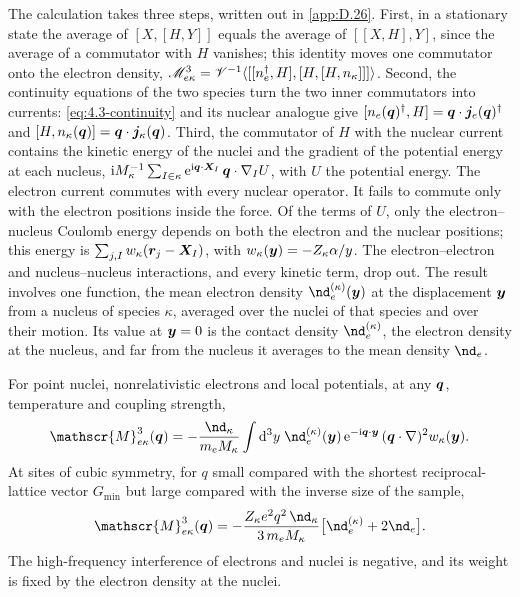 The calculation takes three steps, written out in \cref{app:D.26}. First, in a stationary state the average of $[X, [H, Y]]$ equals the average of $[[X, H], Y]$, since the average of a commutator with $H$ vanishes; this identity moves one commutator onto the electron density, $\mathscr{M}^3_{e\kappa} = \mathscr{V}^{-1}\langle[[n_e^\dagger, H], [H, [H, n_\kappa]]]\rangle$. Second, the continuity equations of the two species turn the two inner commutators into currents: \cref{eq:4.3-continuity} and its nuclear analogue give $[n_e(\bm{q})^\dagger, H] = \bm{q}\cdot\bm{j}_e(\bm{q})^\dagger$ and $[H, n_\kappa(\bm{q})] = \bm{q}\cdot\bm{j}_\kappa(\bm{q})$. Third, the commutator of $H$ with the nuclear current contains the kinetic energy of the nuclei and the gradient of the potential energy at each nucleus, $\mathrm{i} M_\kappa^{-1}\sum_{I\in\kappa}\mathrm{e}^{\mathrm{i}\bm{q}\cdot\bm{X}_I}\,\bm{q}\cdot\nabla_IU$, with $U$ the potential energy. The electron current commutes with every nuclear operator. It fails to commute only with the electron positions inside the force. Of the terms of $U$, only the electron--nucleus Coulomb energy depends on both the electron and the nuclear positions; this energy is $\sum_{j,I}w_\kappa(\bm{r}_j - \bm{X}_I)$, with $w_\kappa(\bm{y}) = -Z_\kappa\alpha/y$. The electron--electron and nucleus--nucleus interactions, and every kinetic term, drop out. The result involves one function, the mean electron density $\nd_e^{(\kappa)}(\vect{y})$ at the displacement $\bm{y}$ from a nucleus of species $\kappa$, averaged over the nuclei of that species and over their motion. Its value at $\bm{y} = 0$ is the contact density $\nd_e^{(\kappa)}$, the electron density at the nucleus, and far from the nucleus it averages to the mean density $\nd_e$.
\begin{keyresult}
For point nuclei, nonrelativistic electrons and local potentials, at any $\bm{q}$, temperature and coupling strength,
\begin{equation}
  \mathscr{M}^3_{e\kappa}(\vect{q}) = -\frac{\nd_\kappa}{m_eM_\kappa}\int\dd^3y\;\nd_e^{(\kappa)}(\vect{y})\,\ee^{-\ii\vect{q}\cdot\vect{y}}\,(\vect{q}\cdot\nabla)^2w_\kappa(\vect{y}) .
  \label{eq:8.3-M3}
\end{equation}
At sites of cubic symmetry, for $q$ small compared with the shortest reciprocal-lattice vector $G_{\mathrm{min}}$ but large compared with the inverse size of the sample,
\begin{equation}
  \mathscr{M}^3_{e\kappa}(\vect{q}) = -\frac{Z_\kappa e^2q^2\,\nd_\kappa}{3\,m_eM_\kappa}\bigl[\nd_e^{(\kappa)} + 2\nd_e\bigr] .
  \label{eq:8.3-M3lim}
\end{equation}
The high-frequency interference of electrons and nuclei is negative, and its weight is fixed by the electron density at the nuclei.
\end{keyresult}
